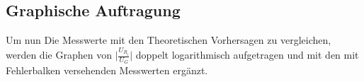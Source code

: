 \subsection{Graphische Auftragung}
Um nun Die Messwerte mit den Theoretischen Vorhersagen zu vergleichen, werden die Graphen von \( \big\vert \frac{U_{R_i}}{U_G} \big\vert \) doppelt logarithmisch aufgetragen und mit den mit Fehlerbalken versehenden Messwerten ergänzt.
\begin{center}
\begin{minipage}{\linewidth}
\centering
{}
\end{minipage}
\begin{minipage}{\linewidth}
\centering
{}
\end{minipage}
\begin{minipage}{\linewidth}
\centering

\end{minipage}
\end{center}
